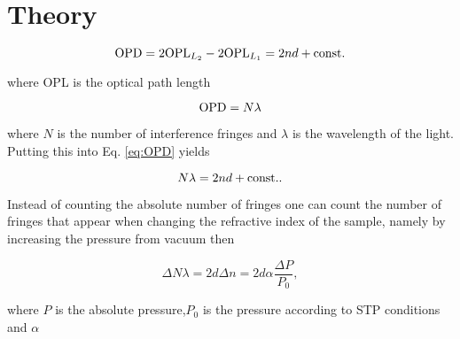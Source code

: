 \section{Theory}

\begin{equation}
  \label{eq:OPD}
  \textnormal{OPD} = 2\textnormal{OPL}_{L_2} - 2\textnormal{OPL}_{L_1} = 2nd + \textnormal{const.}
\end{equation}

where OPL is the optical path length

\begin{equation}
  \label{eq:interference}
  \textnormal{OPD} = N \lambda
\end{equation}

where $N$ is the number of interference fringes and $\lambda$ is the wavelength of the light. Putting this into Eq. \eqref{eq:OPD} yields

\begin{equation*}
  N \lambda = 2nd + \textnormal{const.}.
\end{equation*}

Instead of counting the absolute number of fringes one can count the number of fringes that appear when changing the refractive index of the sample, namely by increasing the pressure from vacuum then

\begin{equation*}
  \Delta N \lambda = 2d \Delta n = 2 d \alpha \frac{\Delta P}{P_0},
\end{equation*}

where $P$ is the absolute pressure,$P_0$ is the pressure according to STP conditions and $\alpha$ 


